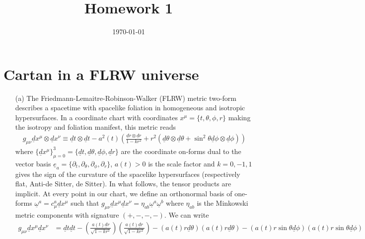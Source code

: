 \documentclass[10pt, a4paper]{article}
\title{Homework 1} %
\author{\PA} %
\date{\today} %
\begin{document}
\maketitlepage

\maketableofcontents


\footnotesize{

\section{Cartan in a FLRW universe}
\begin{enumerate}
  \item[(a)] The Friedmann-Lemaitre-Robinson-Walker (FLRW) metric two-form describes a spacetime with spacelike foliation in homogeneous and isotropic hypersurfaces. In a coordinate chart with coordinates $x^\mu = \{t, \theta, \phi, r\}$ making the isotropy and foliation manifest, this metric reads 
  \vspace{-0.4cm}
  \begin{align*}
    g_{\mu \nu} \underline{d} x^\mu \otimes \underline{d} x^\nu \equiv  \underline{d} t \otimes \underline{d} t -a^2(t)\left(\frac{\underline{d} r \otimes \underline{d} r }{1-k r^2}+r^2\left(\underline{d} \theta \otimes \underline{d} \theta +\sin ^2 \theta \underline{d} \phi \otimes \underline{d} \phi \right) \right)
  \end{align*}
  where $\{\underline{d}x^\mu\}_{\mu = 0}^3 = \{\underline{d}t, \underline{d}\theta, \underline{d}\phi, \underline{d}r\}$ are the coordinate on-forms dual to the vector basis $\underline{e}_{a} = \{\partial_{t}, \partial_{\theta}, \partial_{\phi}, \partial_{r}\}$,  $a(t)> 0$ is the scale factor and $k = 0, -1, 1$ gives the sign of the curvature of the spacelike hypersurfaces (respectively flat, Anti-de Sitter, de Sitter). In what follows, the tensor products are implicit. At every point in our chart, we define an orthonormal basis of one-forms $\underline{\omega}^a = c_\mu^a \underline{d}x^\mu$ such that $g_{\mu \nu} \underline{d} x^\mu \underline{d} x^\nu = \eta_{ab} \underline{\omega}^a \underline{\omega}^b$ where $\eta_{ab}$ is the Minkowski metric components with signature $(+, -, -, -)$. We can write 
  \begin{align*}
    g_{\mu \nu} \underline{d} x^\mu \underline{d} x^\nu &=  \underline{d} t \underline{d} t -\left(\frac{a(t)\underline{d} r}{\sqrt{1-k r^2}}\right)\left(\frac{a(t)\underline{d} r}{\sqrt{1-k r^2}}\right)-\left(a(t) r\underline{d} \theta\right)\left(a(t) r\underline{d} \theta\right) -(a(t) r\sin \theta \underline{d} \phi) (a(t) r \sin \theta\underline{d} \phi)\\

\end{align*}
\end{enumerate}}
\end{document}
